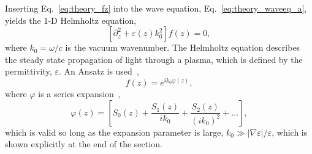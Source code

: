 Inserting Eq.~\ref{eq:theory_fz} into the wave equation, Eq.~\ref{eq:theory_waveeq_a}, yields the 1-D Helmholtz equation,
\begin{equation}
    \label{eq:theory_Helmholtz}
    \left[ \partial_z^2 + \varepsilon(z)k_0^2 \right] f(z) = 0,
\end{equation}
where $k_0=\omega/c$ is the vacuum wavenumber.
The Helmholtz equation describes the steady state propagation of light through a plasma, which is defined by the permittivity, $\varepsilon$.
An Ansatz is used~\cite{michel_introduction_2023},
\begin{equation}
    \label{eq:theory_Helmholtz_ansatz}
    f(z) = e^{i k_0 \varphi (z)},
\end{equation}
where $\varphi$ is a series expansion~\cite{colaitis_modeling_2014},
\begin{equation}
    \label{eq:theory_S_expansion}
    \varphi(z) = \left[ S_0 (z) + \frac{S_1 (z)}{i k_0} + \frac{S_2 (z)}{(i k_0)^2} + \dots \right],
\end{equation}
which is valid so long as the expansion parameter is large, $k_0 \gg |\nabla \varepsilon|/\varepsilon$, which is shown explicitly at the end of the section.

